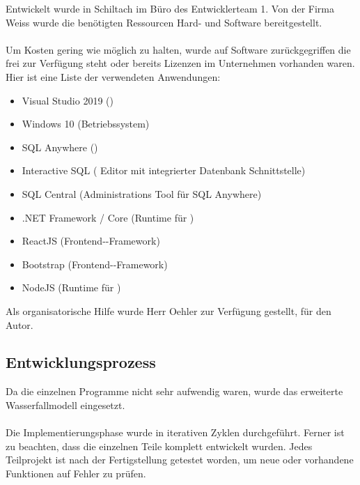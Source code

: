 Entwickelt wurde in Schiltach im Büro des Entwicklerteam 1.
Von der Firma Weiss wurde die benötigten Ressourcen Hard- und Software bereitgestellt. \\
\\
Um Kosten gering wie möglich zu halten, wurde auf Software zurückgegriffen die frei zur Verfügung steht oder bereits Lizenzen im Unternehmen vorhanden waren. Hier ist eine Liste der verwendeten Anwendungen:
\begin{itemize}
    \item Visual Studio 2019    ()
    \item Windows 10            (Betriebssystem)
    \item SQL Anywhere          ()
    \item Interactive SQL       ( Editor mit integrierter Datenbank Schnittstelle)
    \item SQL Central           (Administrations Tool für SQL Anywhere)
    \item .NET Framework / Core (Runtime für )
    \item ReactJS               (Frontend--Framework)
    \item Bootstrap             (Frontend--Framework)
    \item NodeJS                (Runtime für )
\end{itemize}

Als organisatorische Hilfe wurde Herr Oehler zur Verfügung gestellt, für den Autor.

\subsection{Entwicklungsprozess}
\label{sec:Entwicklungsprozess}

Da die einzelnen Programme nicht sehr aufwendig waren, wurde das erweiterte Wasserfallmodell eingesetzt.\\
\\
Die Implementierungsphase wurde in iterativen Zyklen durchgeführt. Ferner ist zu beachten, dass die einzelnen Teile komplett entwickelt wurden. Jedes Teilprojekt ist nach der Fertigstellung getestet worden, um neue oder vorhandene Funktionen auf Fehler zu prüfen.


